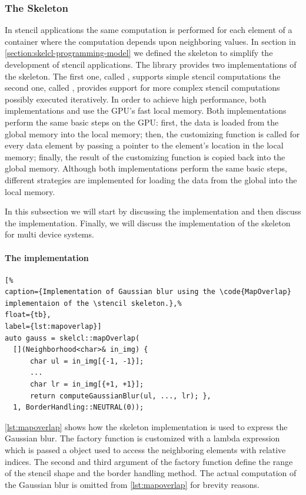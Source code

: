\subsubsection{The \stencil Skeleton}
\label{sec:skelcl:stencil}
In stencil applications the same computation is performed for each element of a container where the computation depends upon neighboring values.
In section in \autoref{section:skelcl-programming-model} we defined the \stencil skeleton to simplify the development of stencil applications.
The \SkelCL library provides two implementations of the \stencil skeleton.
The first one, called , supports simple stencil computations the second one, called , provides support for more complex stencil computations possibly executed iteratively.
In order to achieve high performance, both implementations  and  use the GPU's fast local memory.
Both implementations perform the same basic steps on the GPU:
first, the data is loaded from the global memory into the local memory;
then, the customizing function is called for every data element by passing a pointer to the element's location in the local memory;
finally, the result of the customizing function is copied back into the global memory.
Although both implementations perform the same basic steps, different strategies are implemented for loading the data from the global into the local memory.

In this subsection we will start by discussing the  implementation and then discuss the  implementation.
Finally, we will discuss the implementation of the \stencil skeleton for multi device systems.

\paragraph{The  implementation}

\begin{lstlisting}[%
caption={Implementation of Gaussian blur using the \code{MapOverlap} implementaion of the \stencil skeleton.},%
float={tb},
label={lst:mapoverlap}]
auto gauss = skelcl::mapOverlap(
  [](Neighborhood<char>& in_img) {
      char ul = in_img[{-1, -1}];
      ...
      char lr = in_img[{+1, +1}];
      return computeGaussianBlur(ul, ..., lr); },
  1, BorderHandling::NEUTRAL(0));
\end{lstlisting}

\autoref{lst:mapoverlap} shows how the  skeleton implementation is used to express the Gaussian blur.
The  factory function is customized with a lambda expression which is passed a  object used to access the neighboring elements with relative indices.
The second and third argument of the factory function define the range of the stencil shape and the border handling method.
The actual computation of the Gaussian blur is omitted from \autoref{lst:mapoverlap} for brevity reasons.

